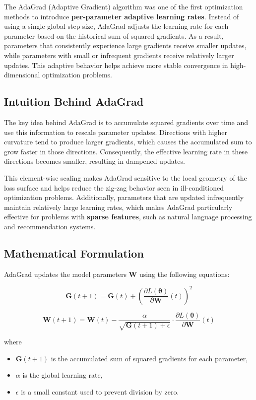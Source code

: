 \documentclass{article}
\begin{document}
The AdaGrad (Adaptive Gradient) algorithm was one of the first optimization methods to introduce \textbf{per-parameter adaptive learning rates}. Instead of using a single global step size, AdaGrad adjusts the learning rate for each parameter based on the historical sum of squared gradients. As a result, parameters that consistently experience large gradients receive smaller updates, while parameters with small or infrequent gradients receive relatively larger updates. This adaptive behavior helps achieve more stable convergence in high-dimensional optimization problems.

\subsection{Intuition Behind AdaGrad}

The key idea behind AdaGrad is to accumulate squared gradients over time and use this information to rescale parameter updates. Directions with higher curvature tend to produce larger gradients, which causes the accumulated sum to grow faster in those directions. Consequently, the effective learning rate in these directions becomes smaller, resulting in dampened updates.

This element-wise scaling makes AdaGrad sensitive to the local geometry of the loss surface and helps reduce the zig-zag behavior seen in ill-conditioned optimization problems. Additionally, parameters that are updated infrequently maintain relatively large learning rates, which makes AdaGrad particularly effective for problems with \textbf{sparse features}, such as natural language processing and recommendation systems.

\subsection{Mathematical Formulation}

AdaGrad updates the model parameters \( \mathbf{W} \) using the following equations:

\[
\mathbf{G}(t+1) = \mathbf{G}(t) + \left( \frac{\partial L(\boldsymbol{\theta})}{\partial \mathbf{W}}(t) \right)^2
\]

\[
\mathbf{W}(t+1) = \mathbf{W}(t) - 
\frac{\alpha}{\sqrt{\mathbf{G}(t+1) + \epsilon}}
\cdot 
\frac{\partial L(\boldsymbol{\theta})}{\partial \mathbf{W}}(t)
\]

\noindent where
\begin{itemize}
    \item \( \mathbf{G}(t+1) \) is the accumulated sum of squared gradients for each parameter,
    \item \( \alpha \) is the global learning rate,
    \item \( \epsilon \) is a small constant used to prevent division by zero.
\end{itemize}
\end{document}
